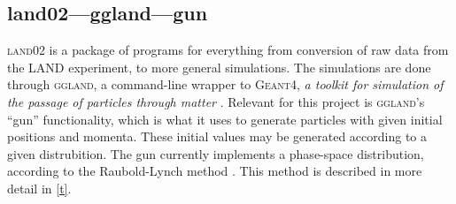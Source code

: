 \documentclass[12pt, a4paper]{article}
\begin{document}
\subsection{land02---ggland---gun}
\textsc{land02} is a package of programs for everything from conversion of raw data from the LAND experiment, to more general simulations. The simulations are done through \textsc{ggland}, a command-line wrapper to \textsc{Geant4}, \emph{a toolkit for simulation of the passage of particles through matter} \cite{ggland}\cite{g4}. Relevant for this project is \textsc{ggland}'s ``gun'' functionality, which is what it uses to generate particles with given initial positions and momenta. These initial values may be generated according to a given distrubition. The gun currently implements a phase-space distribution, according to the Raubold-Lynch method \cite{phasespace}. This method is described in more detail in \autoref{t}.
\end{document}
